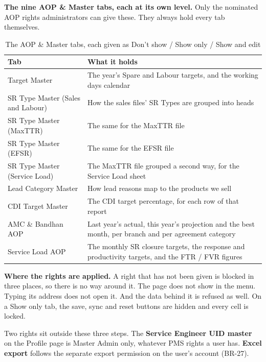 \documentclass[11pt,a4paper]{article}
\begin{document}
\textbf{The nine AOP \& Master tabs, each at its own level.} Only the nominated AOP rights
administrators can give these. They always hold every tab themselves.

\begin{table}[H]\centering\small
\renewcommand{\arraystretch}{1.2}
\begin{tabularx}{\linewidth}{@{}|p{5.6cm}|X|@{}}
\hline
\rowcolor{brdhead}\textbf{Tab} & \textbf{What it holds}\\
\hline
Target Master & The year's Spare and Labour targets, and the working days calendar\\
\hline
SR Type Master (Sales and Labour) & How the sales files' SR Types are grouped into heads\\
\hline
SR Type Master (MaxTTR) & The same for the MaxTTR file\\
\hline
SR Type Master (EFSR) & The same for the EFSR file\\
\hline
SR Type Master (Service Load) & The MaxTTR file grouped a second way, for the Service
Load sheet\\
\hline
Lead Category Master & How lead reasons map to the products we sell\\
\hline
CDI Target Master & The CDI target percentage, for each row of that report\\
\hline
AMC \& Bandhan AOP & Last year's actual, this year's projection and the best month, per
branch and per agreement category\\
\hline
Service Load AOP & The monthly SR closure targets, the response and productivity targets,
and the FTR / FVR figures\\
\hline
\end{tabularx}
\caption{The AOP \& Master tabs, each given as Don't show / Show only / Show and edit}
\end{table}

\textbf{Where the rights are applied.} A right that has not been given is blocked in three
places, so there is no way around it. The page does not show in the menu. Typing its
address does not open it. And the data behind it is refused as well. On a Show only tab,
the save, sync and reset buttons are hidden and every cell is locked.

Two rights sit outside these three steps. The \textbf{Service Engineer UID master} on the
Profile page is Master Admin only, whatever PMS rights a user has. \textbf{Excel export}
follows the separate export permission on the user's account (BR-27).
\end{document}
